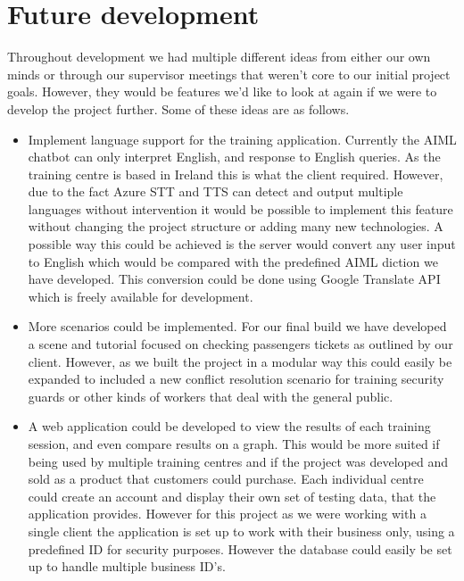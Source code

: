 \section{Future development}
Throughout development we had multiple different ideas from either our own minds or through our supervisor meetings that weren't core to our initial project goals. However, they would be features we'd like to look at again if we were to develop the project further. Some of these ideas are as follows.
\begin{itemize}
    \item Implement language support for the training application. Currently the AIML chatbot can only interpret English, and response to English queries. As the training centre is based in Ireland this is what the client required. However, due to the fact Azure STT and TTS can detect and output multiple languages without intervention it would be possible to implement this feature without changing the project structure or adding many new technologies. A possible way this could be achieved is the server would convert any user input to English which would be compared with the predefined AIML diction we have developed. This conversion could be done using Google Translate API which is freely available for development.
    
    \item More scenarios could be implemented. For our final build we have developed a scene and tutorial focused on checking passengers tickets as outlined by our client. However, as we built the project in a modular way this could easily be expanded to included a new conflict resolution scenario for training security guards or other kinds of workers that deal with the general public. 
    
    \item A web application could be developed to view the results of each training session, and even compare results on a graph. This would be more suited if being used by multiple training centres and if the project was developed and sold as a product that customers could purchase. Each individual centre could create an account and display their own set of testing data, that the application provides. However for this project as we were working with a single client the application is set up to work with their business only, using a predefined ID for security purposes. However the database could easily be set up to handle multiple business ID's.
    
\end{itemize}

